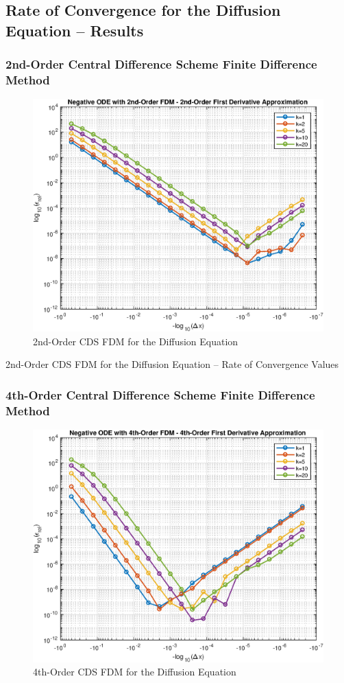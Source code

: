 \documentclass[10pt]{article}		%
\numberwithin{equation}{section}
\begin{document}
\newpage

\subsection{Rate of Convergence for the Diffusion Equation -- Results}

\subsubsection{2nd-Order Central Difference Scheme Finite Difference Method}

\begin{figure}[H]
	\begin{center}
		\includegraphics[width = 0.5\linewidth]{negative_ode_order_2_fd_order_2}
		\caption{2nd-Order CDS FDM for the Diffusion Equation}	
	\end{center}
\end{figure}

\begin{table}[H]
	
	\caption{2nd-Order CDS FDM for the Diffusion Equation -- Rate of Convergence Values}	
\end{table}

\newpage

\subsubsection{4th-Order Central Difference Scheme Finite Difference Method}

\begin{figure}[H]
	\begin{center}
		\includegraphics[width = 0.5\linewidth]{negative_ode_order_4_fd_order_4}
		\caption{4th-Order CDS FDM for the Diffusion Equation}	
	\end{center}
\end{figure}
\end{document}
